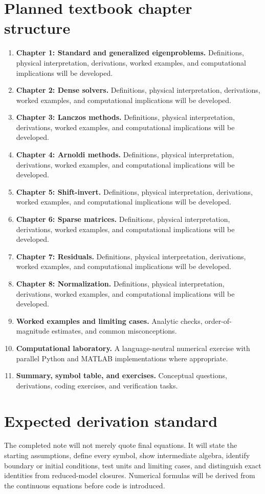 \documentclass[11pt]{article}
\begin{document}
\section{Planned textbook chapter structure}
\begin{enumerate}[leftmargin=1.8em]
\item \textbf{Chapter 1: Standard and generalized eigenproblems.} Definitions, physical interpretation, derivations, worked examples, and computational implications will be developed.
\item \textbf{Chapter 2: Dense solvers.} Definitions, physical interpretation, derivations, worked examples, and computational implications will be developed.
\item \textbf{Chapter 3: Lanczos methods.} Definitions, physical interpretation, derivations, worked examples, and computational implications will be developed.
\item \textbf{Chapter 4: Arnoldi methods.} Definitions, physical interpretation, derivations, worked examples, and computational implications will be developed.
\item \textbf{Chapter 5: Shift-invert.} Definitions, physical interpretation, derivations, worked examples, and computational implications will be developed.
\item \textbf{Chapter 6: Sparse matrices.} Definitions, physical interpretation, derivations, worked examples, and computational implications will be developed.
\item \textbf{Chapter 7: Residuals.} Definitions, physical interpretation, derivations, worked examples, and computational implications will be developed.
\item \textbf{Chapter 8: Normalization.} Definitions, physical interpretation, derivations, worked examples, and computational implications will be developed.
\item \textbf{Worked examples and limiting cases.} Analytic checks, order-of-magnitude estimates, and common misconceptions.
\item \textbf{Computational laboratory.} A language-neutral numerical exercise with parallel Python and MATLAB implementations where appropriate.
\item \textbf{Summary, symbol table, and exercises.} Conceptual questions, derivations, coding exercises, and verification tasks.
\end{enumerate}

\section{Expected derivation standard}
The completed note will not merely quote final equations. It will state the starting assumptions, define every symbol, show intermediate algebra, identify boundary or initial conditions, test units and limiting cases, and distinguish exact identities from reduced-model closures. Numerical formulas will be derived from the continuous equations before code is introduced.
\end{document}
